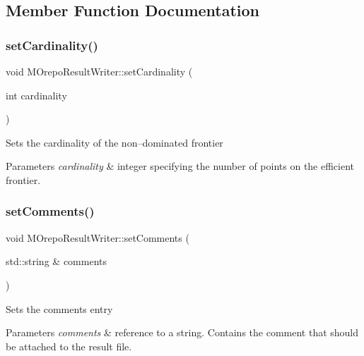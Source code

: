 \subsection{Member Function Documentation}
\mbox{\label{class_m_orepo_result_writer_af1c8ffb740f29485e1132d65935ab9a1}} 
\subsubsection{\texorpdfstring{set\+Cardinality()}{setCardinality()}}
{\footnotesize\ttfamily void M\+Orepo\+Result\+Writer\+::set\+Cardinality (\begin{DoxyParamCaption}\item[{int}]{cardinality }\end{DoxyParamCaption})\hspace{0.3cm}{\ttfamily [inline]}}

Sets the cardinality of the non--dominated frontier 
\begin{DoxyParams}{Parameters}
{\em cardinality} & integer specifying the number of points on the efficient frontier. \\
\hline
\end{DoxyParams}
\mbox{\label{class_m_orepo_result_writer_ad88bdad7c191a3ac3db5456fc03cf1e6}} 
\subsubsection{\texorpdfstring{set\+Comments()}{setComments()}}
{\footnotesize\ttfamily void M\+Orepo\+Result\+Writer\+::set\+Comments (\begin{DoxyParamCaption}\item[{std\+::string \&}]{comments }\end{DoxyParamCaption})\hspace{0.3cm}{\ttfamily [inline]}}

Sets the comments entry 
\begin{DoxyParams}{Parameters}
{\em comments} & reference to a string. Contains the comment that should be attached to the result file. \\
\hline
\end{DoxyParams}
\mbox{\label{class_m_orepo_result_writer_adb06e067ac54ccfd2af8a5fdc53957dd}} 
